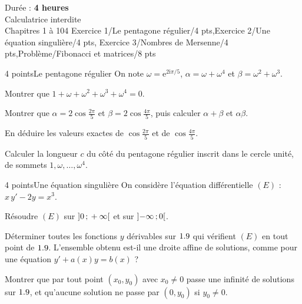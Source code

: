 
  {Durée : \textbf{4 heures}\\Calculatrice interdite\\Chapitres 1 à 10}{4}
  {Exercice 1/Le pentagone régulier/4 pts,Exercice 2/Une équation singulière/4 pts,%
   Exercice 3/Nombres de Mersenne/4 pts,Problème/Fibonacci et matrices/8 pts}

\begin{exoEval}{4 points}{Le pentagone régulier}
On note $\omega=\mathrm{e}^{2\mathrm{i}\pi/5}$, $\alpha=\omega+\omega^{4}$ et
$\beta=\omega^{2}+\omega^{3}$.
\begin{questions}
  \item Montrer que $1+\omega+\omega^{2}+\omega^{3}+\omega^{4}=0$.
  \item Montrer que $\alpha=2\cos\frac{2\pi}{5}$ et $\beta=2\cos\frac{4\pi}{5}$,
    puis calculer $\alpha+\beta$ et $\alpha\beta$.
  \item En déduire les valeurs exactes de $\cos\frac{2\pi}{5}$ et de
    $\cos\frac{4\pi}{5}$.
  \item Calculer la longueur $c$ du côté du pentagone régulier inscrit dans
    le cercle unité, de sommets $1,\omega,\dots,\omega^{4}$.
\end{questions}
\end{exoEval}

\begin{exoEval}{4 points}{Une équation singulière}
On considère l'équation différentielle $(E)$ : $x\,y'-2y=x^{3}$.
\begin{questions}
  \item Résoudre $(E)$ sur $\mathopen{]}0\,{;}\,+\infty\mathclose{[}$ et sur $\mathopen{]}-\infty\,{;}\,0\mathclose{[}$.
  \item Déterminer toutes les fonctions $y$ dérivables sur $1.9$ qui
    vérifient $(E)$ en tout point de $1.9$. L'ensemble obtenu est-il une
    droite affine de solutions, comme pour une équation $y'+a(x)y=b(x)$ ?
  \item Montrer que par tout point $(x_0,y_0)$ avec $x_0\neq0$ passe une
    infinité de solutions sur $1.9$, et qu'aucune solution ne passe par
    $(0,y_0)$ si $y_0\neq0$.
\end{questions}
\end{exoEval}

